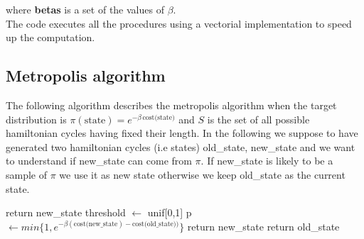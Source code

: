 \documentclass{article}
\begin{document}
\noindent where \textbf{betas} is a set of the values of $\beta$. \\ 
The code executes all the procedures using a vectorial implementation to speed up the computation.

\subsection{Metropolis algorithm}

The following algorithm describes the metropolis algorithm when the target distribution is $\pi(\text{state}) = e^{- \beta \, \text{cost(state)}}$ and $S$ is the set of all possible hamiltonian cycles having fixed their length. In the following we suppose to have generated two hamiltonian cycles (i.e states) old\_state, new\_state and we want to understand if new\_state can come from $\pi$. If new\_state is likely to be a sample of $\pi$ we use it as new state otherwise we keep old\_state as the current state.

\begin{algorithm}[H]
    \begin{algorithmic}[1]
      	\State return new\_state
      	\EndIf
        \State threshold $\leftarrow$ unif[0,1]
        \State p  $\leftarrow min\{1,e^{- \beta (\text{cost(new\_state}) - \text{cost(old\_state}))} \}$ 
        	\State return new\_state
        \Else
        	\State return old\_state
        \EndIf
       \EndFunction
\end{algorithmic}
\end{algorithm}
\noindent
\end{document}
